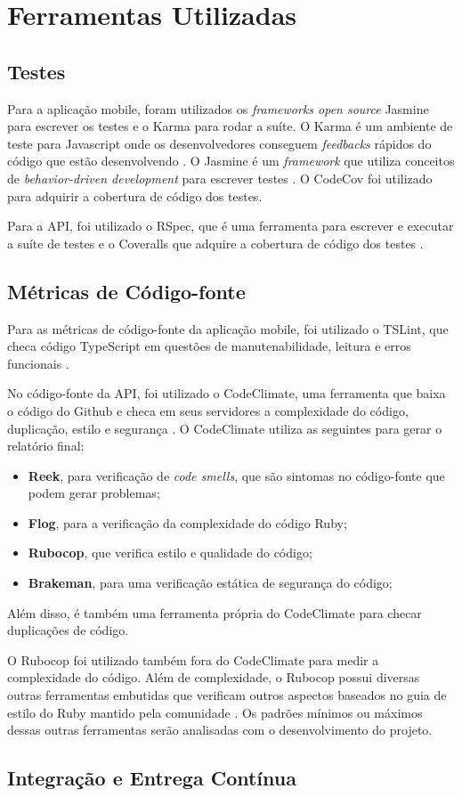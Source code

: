 \section{Ferramentas Utilizadas}

\subsection{Testes}
Para a aplicação mobile, foram utilizados os \textit{frameworks open source} Jasmine para escrever os testes e o Karma para rodar a suíte. O Karma é um ambiente de teste para Javascript onde os desenvolvedores conseguem \textit{feedbacks} rápidos do código que estão desenvolvendo \cite{karma}. O Jasmine é um \textit{framework} que utiliza conceitos de \textit{behavior-driven development} para escrever testes \cite{jasmine}. O CodeCov foi utilizado para adquirir a cobertura de código dos testes.

Para a API, foi utilizado o RSpec, que é uma ferramenta para escrever e executar a suíte de testes \cite{rspec} e o Coveralls que adquire a cobertura de código dos testes \cite{coveralls}.

\subsection{Métricas de Código-fonte}
Para as métricas de código-fonte da aplicação mobile, foi utilizado o TSLint, que checa código TypeScript em questões de manutenabilidade, leitura e erros funcionais \cite{tslint}.

No código-fonte da API, foi utilizado o CodeClimate, uma ferramenta que baixa o código do Github e checa em seus servidores a complexidade do código, duplicação, estilo e segurança \cite{codeclimate}. O CodeClimate utiliza as seguintes para gerar o relatório final:
\begin{itemize}
    \item \textbf{Reek}, para verificação de \textit{code smells}, que são sintomas no código-fonte que podem gerar problemas;
    \item \textbf{Flog}, para a verificação da complexidade do código Ruby;
    \item \textbf{Rubocop}, que verifica estilo e qualidade do código;
    \item \textbf{Brakeman}, para uma verificação estática de segurança do código;
\end{itemize}

Além disso, é também uma ferramenta própria do CodeClimate para checar duplicações de código.

O Rubocop foi utilizado também fora do CodeClimate para medir a complexidade do código. Além de complexidade, o Rubocop possui diversas outras ferramentas embutidas que verificam outros aspectos baseados no guia de estilo do Ruby mantido pela comunidade \cite{rubocop}. Os padrões mínimos ou máximos dessas outras ferramentas serão analisadas com o desenvolvimento do projeto.

\subsection{Integração e Entrega Contínua}
